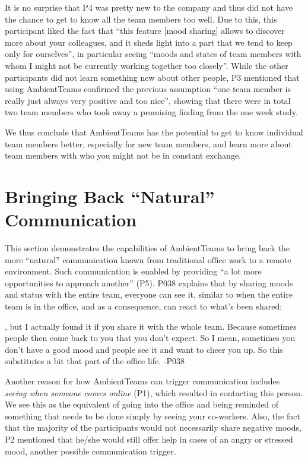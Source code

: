 It is no surprise that P4 was pretty new to the company and thus did not have the chance to get to know all the team members too well. Due to this, this participant liked the fact that \enquote{this feature [mood sharing] allows to discover more about your colleagues, and it sheds light into a part that we tend to keep only for ourselves}, in particular seeing \enquote{moods and states of team members with whom I might not be currently working together too closely}. While the other participants did not learn something new about other people, P3 mentioned that using AmbientTeams confirmed the previous assumption \enquote{one team member is really just always very positive and too nice}, showing that there were in total two team members who took away a promising finding from the one week study.

We thus conclude that AmbientTeams has the potential to get to know individual team members better, especially for new team members, and learn more about team members with who you might not be in constant exchange.


\section{Bringing Back \enquote{Natural} Communication}
This section demonstrates the capabilities of AmbientTeams to bring back the more \enquote{natural} communication known from traditional office work to a remote environment. Such communication is enabled by providing \enquote{a lot more opportunities to approach another} (P5). P038 explains that by sharing moods and status with the entire team, everyone can see it, similar to when the entire team is in the office, and as a consequence, can react to what's been shared:

\begin{displayquote}[][]
    [...], but I actually found it if you share it with the whole team. Because sometimes people then come back to you that you don't expect. So I mean, sometimes you don't have a good mood and people see it and want to cheer you up. So this substitutes a bit that part of the office life. -P038
\end{displayquote}

Another reason for how AmbientTeams can trigger communication includes \textit{seeing when someone comes online} (P1), which resulted in contacting this person. We see this as the equivalent of going into the office and being reminded of something that needs to be done simply by seeing your co-workers. Also, the fact that the majority of the participants would not necessarily share negative moods, P2 mentioned that he/she would still offer help in cases of an angry or stressed mood, another possible communication trigger.

